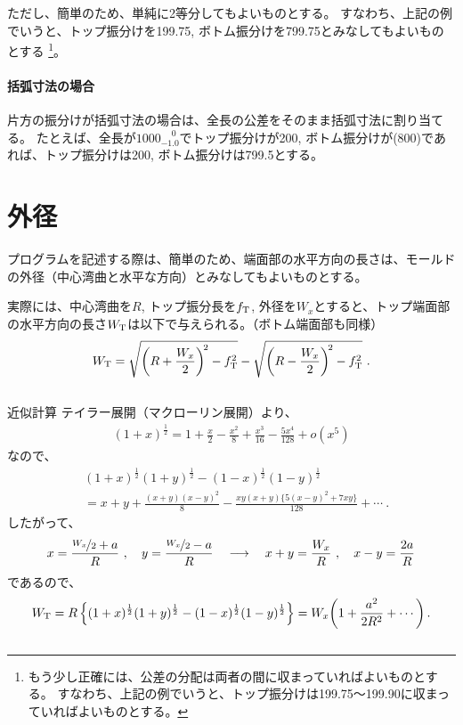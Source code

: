 ただし、簡単のため、単純に2等分してもよいものとする。
すなわち、上記の例でいうと、トップ振分けを199.75, ボトム振分けを799.75とみなしてもよいものとする
\footnote{もう少し正確には、公差の分配は両者の間に収まっていればよいものとする。
すなわち、上記の例でいうと、トップ振分けは199.75～199.90に収まっていればよいものとする。}。

\paragraph{括弧寸法の場合}\noindent
片方の振分けが括弧寸法の場合は、全長の公差をそのまま括弧寸法に割り当てる。
たとえば、全長が$1000^{\phantom +0}_{-1.0}$でトップ振分けが200, ボトム振分けが(800)であれば、トップ振分けは200, ボトム振分けは799.5とする。




\section{外径}
\label{app:gaikei}
プログラムを記述する際は、簡単のため、端面部の水平方向の長さは、モールドの外径（中心湾曲と水平な方向）とみなしてもよいものとする。

実際には、中心湾曲を$R$, トップ振分長を$f_\text T$, 外径を$W_x$とすると、トップ端面部の水平方向の長さ$W_\text T$は以下で与えられる。（ボトム端面部も同様）
\begin{align*}
  W_\text T = \sqrt{\left(R+\frac{W_x}2\right)^{\!2}-f_\text T^2}-\sqrt{\left(R-\frac{W_x}2\right)^{\!2}-f_\text T^2}\ .
\end{align*}
\begin{Column}{近似計算}
テイラー展開（マクローリン展開）より、
\begin{align*}
  (1+x)^\frac12 = 1+\frac x2-\frac{x^2}8+\frac{x^3}{16}-\frac{5x^4}{128}+o\!\left(x^5\right)
\end{align*}
なので、
\begin{align*}
  & (1+x)^\frac12(1+y)^\frac12-(1-x)^\frac12(1-y)^\frac12\\
  &= x+y+\frac{(x+y)(x-y)^2}8-\frac{xy(x+y)\big\{5(x-y)^2+7xy\big\}}{128}+\cdots\ .
\end{align*}
したがって、
\begin{align*}
  x = \frac{\nicefrac{W_x}2+a}R\ ,\quad y = \frac{\nicefrac{W_x}2-a}R\quad
  \longrightarrow \quad
  x+y = \frac{W_x}R\ , \quad x-y = \frac{2a}R
\end{align*}
であるので、
\begin{align*}
  W_\text T
  = R\left\{(1+x)^\frac12(1+y)^\frac12-(1-x)^\frac12(1-y)^\frac12\right\}
  = W_x\!\left(1+\frac{a^2}{2R^2}+\cdots\right).
\end{align*}
\end{Column}




